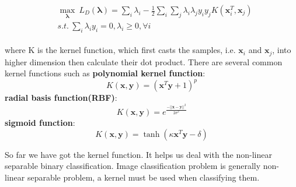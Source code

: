 \begin{align}
\begin{split}
&\max_\mathbf{\lambda} \ L_D(\mathbf{\lambda}) = \sum_i\lambda_i - \frac{1}{2} \sum_i\sum_j\lambda_i\lambda_jy_iy_j K(\mathbf{x}_i^T, \mathbf{x}_j )\\
 &s.t. \ \sum_i\lambda_iy_i = 0, \lambda_i \geq 0, \forall i
\label{eq:svm:dl3}
\end{split}
\end{align}

where K is the kernel function, which first casts the samples, i.e. $\mathbf{x}_i $ and $ \mathbf{x}_j$, into higher dimension then calculate their dot product.
There are several common kernel functions such as \textbf{polynomial kernel function}: 
$$K(\mathbf{x}, \mathbf{y}) = (\mathbf{x}^T\mathbf{y} + 1) ^ p$$
\textbf{radial basis function(RBF)}:
$$K(\mathbf{x}, \mathbf{y}) = e ^\frac{- ||\mathbf{x} -\mathbf{y}||^2}{2\sigma^2}$$
\textbf{sigmoid function}:
$$K(\mathbf{x}, \mathbf{y}) = \tanh(\kappa \mathbf{x}^T\mathbf{y} - \delta)$$

So far we have got the kernel function. It helps us deal with the non-linear separable binary classification.
Image classification problem is generally non-linear separable problem, a kernel must be used when classifying them.